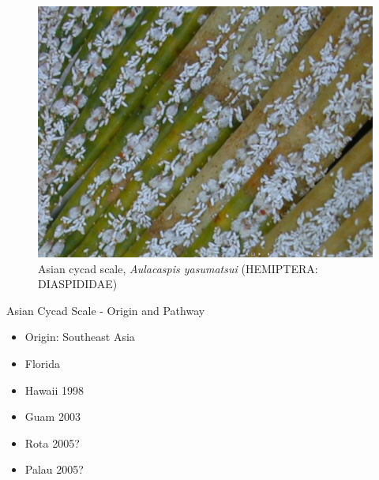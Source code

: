 \documentclass[]{beamer}
\begin{document}
\begin{frame}{07}
	\begin{figure}
		\includegraphics[height=0.7\textheight]{asian-cycad-scale/output-07.png}
		\caption{Asian cycad scale, \textit{Aulacaspis yasumatsui} (HEMIPTERA: DIASPIDIDAE)}
	\end{figure}
\end{frame}

\begin{frame}{Asian Cycad Scale - Origin and Pathway}
	\begin{itemize}
		\item Origin: Southeast Asia
		\item Florida
		\item Hawaii 1998
		\item Guam 2003
		\item Rota 2005?
		\item Palau 2005?
	\end{itemize}
\end{frame}

\begin{frame}{09}
\end{frame}

\begin{frame}{10}
\end{frame}

\begin{frame}{11}
\end{frame}
\end{document}
